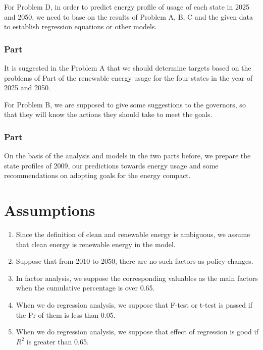 \documentclass[a4paper,11pt]{article}
\begin{document}
\par For Problem D, in order to predict energy profile of usage of each state in 2025 and 2050, we need to base on the results of Problem A, B, C and the given data to establish regression equations or other models.

\subsubsection*{Part \uppercase\expandafter{}}

\par It is suggested in the Problem A that we should determine targets based on the problems of Part \uppercase\expandafter{} of the renewable energy usage for the four states in the year of 2025 and 2050. 

\par For Problem B, we are supposed to give some suggestions to the governors, so that they will know the actions they should take to meet the goals.

\subsubsection*{Part \uppercase\expandafter{}}
\par On the basis of the analysis and models in the two parts before, we prepare the state profiles of 2009, our predictions towards energy usage and some recommendations on adopting goals for the energy compact.


\section{Assumptions}
\begin{enumerate}%
\renewcommand{\labelenumi}{(\theenumi)}
    \item Since the definition of clean and renewable energy is ambiguous, we assume that clean energy is renewable energy in the model.
    \item Suppose that from 2010 to 2050, there are no such factors as policy changes.
    \item In factor analysis, we suppose the corresponding valuables as the main factors when the cumulative percentage is over 0.65.
    \item When we do regression analysis, we suppose that F-test or t-test is passed if the Pr of them is less than 0.05.
    \item When we do regression analysis, we suppose that effect of regression is good if $R^{2}$ is greater than 0.65.
\end{enumerate}
\end{document}
